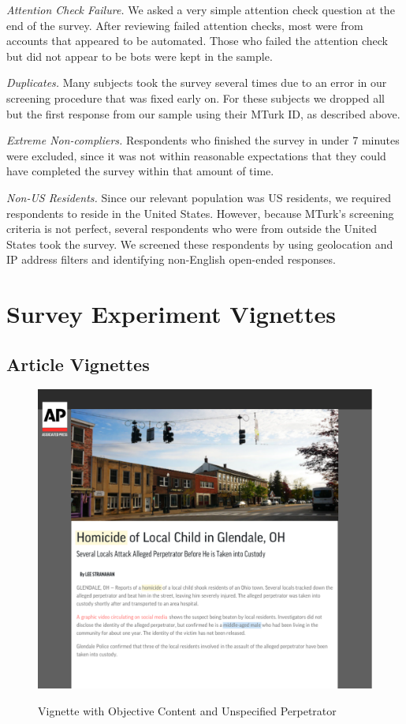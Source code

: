 \documentclass[]{article}
\begin{document}
\textit{Attention Check Failure.} We asked a very simple attention check question at the end of the survey. After reviewing failed attention checks, most were from accounts that appeared to be automated. Those who failed the attention check but did not appear to be bots were kept in the sample.

\textit{Duplicates.} Many subjects took the survey several times due to an error in our screening procedure that was fixed early on. For these subjects we dropped all but the first response from our sample using their MTurk ID, as described above.

\textit{Extreme Non-compliers.} Respondents who finished the survey in under 7 minutes were excluded, since it was not within reasonable expectations that they could have completed the survey within that amount of time.

\textit{Non-US Residents.} Since our relevant population was US residents, we required respondents to reside in the United States. However, because MTurk's screening criteria is not perfect, several respondents who were from outside the United States took the survey. We screened these respondents by using geolocation and IP address filters and identifying non-English open-ended responses.

\section{Survey Experiment Vignettes}

\subsection{Article Vignettes}

\begin{figure}[!htbp]
  \centering
  \caption{Vignette with Objective Content and Unspecified Perpetrator}
  \vspace{1em}
  \includegraphics[width=.75\textwidth]{figures/hom_uns.pdf}\\
  \label{hom_uns}
\end{figure}
\end{document}
